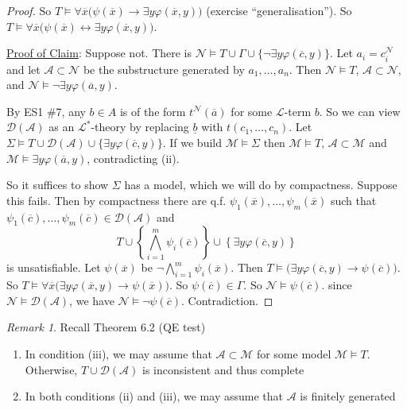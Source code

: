 \documentclass[]{article}
\theoremstyle{custhm}
\theoremstyle{cusdef}
\theoremstyle{custhm}
\theoremstyle{custhm}
\theoremstyle{custhm}
\theoremstyle{ex}
\theoremstyle{custhm}
\theoremstyle{cusdef}
\theoremstyle{remark}
\newtheorem*{remark*}{Remark}
\renewcommand{\L}{\mathcal{L}}
\newcommand{\M}{\mathcal{M}}
\renewcommand{\phi}{\varphi}
\renewcommand{\bar}{\overline}
\newcommand{\N}{\mathcal{N}}
\newcommand{\A}{\mathcal{A}}
\newcommand{\D}{\mathcal{D}}
\begin{document}
\begin{proof}
So $T\models \forall \bar{x}\big(\psi(\bar{x}) \rightarrow \exists y \phi(\bar{x},y)\big)$ (exercise ``generalisation''). So $T\models \forall \bar{x}\big(\psi(\bar{x})\leftrightarrow \exists y\phi(\bar{x},y)\big)$.

\underline{Proof of Claim}: Suppose not. There is $\N\models T\cup\Gamma \cup \{\neg \exists y\phi(\bar{c},y)\}$. Let $a_i = c_i^\N$ and let $\A\subset\N$ be the substructure generated by $a_1,\dots,a_n$. Then $\N\models T$, $\A\subset\N$, and $\N\models \neg \exists y\phi(\bar{a},y)$.

By ES1 \#7, any $b \in A$ is of the form $t^\N(\bar{a})$ for some $\L$-term $b$. So we can view $\D(\A)$ as an $\L^\ast$-theory by replacing $\underline{b}$ with $t(c_1,\dots,c_n)$. Let $\Sigma\models T\cup\D(\A)\cup\{\exists y\phi(\bar{c},y)\}$. If we build $\M\models \Sigma$ then $\M\models T$, $\A\subset \M$ and $\M\models \exists y \phi(\bar{a},y)$, contradicting (ii).

So it suffices to show $\Sigma$ has a model, which we will do by compactness. Suppose this fails. Then by compactness there are q.f. $\psi_1(\bar{x}),\dots,\psi_m(\bar{x})$ such that $\psi_1(\bar{c}),\dots,\psi_m(\bar{c})\in\D(\A)$ and $$ T\cup \left\lbrace \bigwedge_{i=1}^{m}\psi_i(\bar{c})\right\rbrace \cup \left\lbrace \exists y \phi(\bar{c},y)\right\rbrace$$ is unsatisfiable. Let $\psi(\bar{x})$ be $\neg \bigwedge_{i=1}^{m}\psi_i(\bar{x})$. Then $T\models \big(\exists y\phi(\bar{c},y)\rightarrow \psi(\bar{c})\big)$. So $T\models \forall \bar{x} \big(\exists y \phi(\bar{x},y)\rightarrow\psi(\bar{x})\big)$. So $\psi(\bar{c})\in \Gamma$. So $\N\models \psi(\bar{c})$. since $\N\models \D(\A)$, we have $\N\models \neg \psi(\bar{c})$. Contradiction.
\end{proof}



\begin{remark*}
Recall Theorem 6.2 (QE test)
\begin{enumerate}[label=\arabic*)]
	\item In condition (iii), we may assume that $\A\subset\M$ for some model $\M\models T$. Otherwise, $T\cup \D(\A)$ is inconsistent and thus complete
	\item In both conditions (ii) and (iii), we may assume that $\A$ is finitely generated
\end{enumerate}
\end{remark*}
\end{document}
